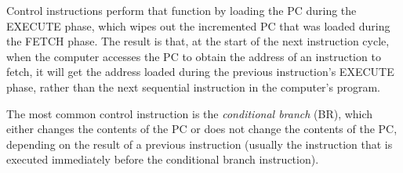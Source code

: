 \documentclass{patt}
\begin{document}
Control instructions perform that function by loading the PC during the
\nobreak EXECUTE phase, which wipes out the incremented
PC that was loaded during the FETCH phase.  The result is that, at the start
of the next instruction cycle, when
the computer accesses the PC to obtain the address of an instruction to fetch,
it will get the address loaded during the previous instruction's EXECUTE phase,
rather than the next sequential instruction in the computer's program.

The most common control instruction is the {\em conditional branch} 
(BR), which either changes the contents of the PC or does not
change the contents of the PC, depending on the result of a previous
instruction (usually the instruction that is executed immediately before 
the conditional branch instruction).
\bigskip
\end{document}
